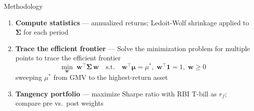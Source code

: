 \documentclass[aspectratio=169]{beamer}
\begin{document}
\begin{frame}{Methodology}
  \begin{enumerate}
    \item \textbf{Compute statistics} --- annualized returns; Ledoit-Wolf shrinkage applied to $\boldsymbol{\Sigma}$ for each period
    \vspace{0.4em}
    \vspace{0.4em}
    \item \textbf{Trace the efficient frontier} --- Solve the minimization problem for multiple points to trace the efficient frontier
      \[
        \min_{\mathbf{w}}\; \mathbf{w}^\top \boldsymbol{\Sigma}\, \mathbf{w}
        \quad\text{s.t.}\quad \mathbf{w}^\top \boldsymbol{\mu} = \mu^*,\;
        \mathbf{w}^\top \mathbf{1} = 1,\; \mathbf{w} \ge 0
      \]
      sweeping $\mu^*$ from GMV to the highest-return asset
    \vspace{0.4em}
    \item \textbf{Tangency portfolio} --- maximize Sharpe ratio with RBI T-bill as $r_f$; compare pre vs.\ post weights
  \end{enumerate}
\end{frame}
\end{document}
